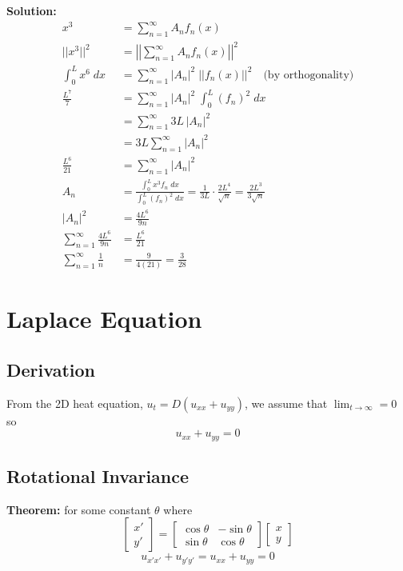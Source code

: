\documentclass[10pt]{article}
\begin{document}
\textbf{Solution:}
\begin{align*}
    x^3 &= \sum_{n=1}^\infty A_n f_n(x)\\
    ||x^3||^2 &= \left|\left|\sum_{n=1}^\infty A_n f_n(x) \right|\right|^2\\
    \int_0^L x^6\; dx &= \sum_{n=1}^\infty |A_n|^2\; ||f_n(x)||^2 \quad \text{(by orthogonality)}\\
    \frac{L^7}{7} &= \sum_{n=1}^\infty |A_n|^2\; \int_0^L (f_n)^2\; dx\\
    &= \sum_{n=1}^\infty 3L\, |A_n|^2\\
    &= 3L \sum_{n=1}^\infty |A_n|^2\\
    \frac{L^6}{21} &= \sum_{n=1}^\infty |A_n|^2\\
    A_n &= \frac{\int_0^L x^3 f_n \;dx}{\int_0^L (f_n)^2\; dx} = \frac{1}{3L} \cdot \frac{2L^4}{\sqrt{n}} = \frac{2L^3}{3\sqrt{n}}\\
    |A_n|^2 &= \frac{4L^6}{9n}\\
    \sum_{n=1}^\infty \frac{4L^6}{9n} &= \frac{L^6}{21}\\
    \sum_{n=1}^\infty \frac{1}{n} &= \frac{9}{4(21)} = \frac{3}{28}
\end{align*}
\section{Laplace Equation}
\subsection{Derivation}
From the 2D heat equation, $u_t = D(u_{xx} + u_{yy})$, we assume that $\lim_{t\to\infty} = 0$ so 
\[u_{xx} + u_{yy} = 0\]

\subsection{Rotational Invariance}
\textbf{Theorem:} for some constant $\theta$ where 
\[\begin{bmatrix}
    x'\\y'
\end{bmatrix} = \begin{bmatrix}
    \cos \theta & -\sin \theta\\
    \sin \theta & \cos \theta
\end{bmatrix} \begin{bmatrix}
    x\\y
\end{bmatrix}\]
\[u_{x'x'} + u_{y'y'} = u_{xx}+ u_{yy} = 0\]
\end{document}
